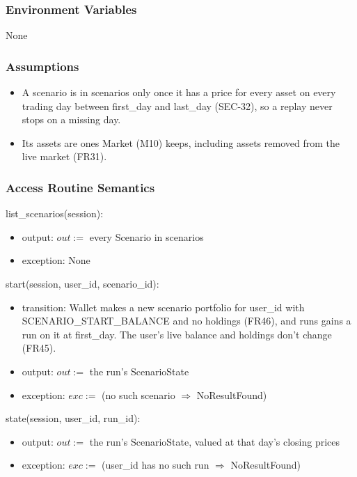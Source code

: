 \documentclass[12pt, titlepage]{article}
\begin{document}
\subsubsection{Environment Variables}

None

\subsubsection{Assumptions}

\begin{itemize}
\item A scenario is in scenarios only once it has a price for every asset on
  every trading day between first\_day and last\_day (SEC-32), so a replay
  never stops on a missing day.
\item Its assets are ones Market (M10) keeps, including assets removed from
  the live market (FR31).
\end{itemize}

\subsubsection{Access Routine Semantics}

\noindent list\_scenarios(session):
\begin{itemize}
\item output: $out :=$ every Scenario in scenarios
\item exception: None
\end{itemize}

\noindent start(session, user\_id, scenario\_id):
\begin{itemize}
\item transition: Wallet makes a new scenario portfolio for user\_id with
  SCENARIO\_START\_BALANCE and no holdings (FR46), and runs gains a run on it
  at first\_day. The user's live balance and holdings don't change (FR45).
\item output: $out :=$ the run's ScenarioState
\item exception: $exc :=$ (no such scenario $\Rightarrow$ NoResultFound)
\end{itemize}

\noindent state(session, user\_id, run\_id):
\begin{itemize}
\item output: $out :=$ the run's ScenarioState, valued at that day's closing
  prices
\item exception: $exc :=$ (user\_id has no such run $\Rightarrow$
  NoResultFound)
\end{itemize}
\end{document}
